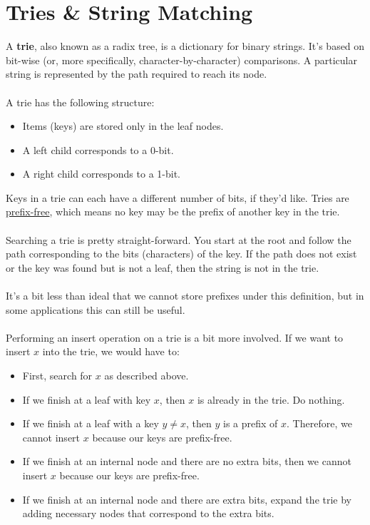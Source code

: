 \documentclass[]{article}
\theoremstyle{definition}
\newcommand{\lecture}[1]{\marginpar{{\footnotesize $\leftarrow$ \underline{#1}}}}
\begin{document}
	\section{Tries \& String Matching} \lecture{March 19, 2013} %
		A \textbf{trie}, also known as a radix tree, is a dictionary for binary strings. It's based on bit-wise (or, more specifically, character-by-character) comparisons. A particular string is represented by the path required to reach its node.
		\\ \\
		A trie has the following structure:
		\begin{itemize}
			\item Items (keys) are stored only in the leaf nodes.
			\item A left child corresponds to a 0-bit.
			\item A right child corresponds to a 1-bit.
		\end{itemize}

		Keys in a trie can each have a different number of bits, if they'd like. Tries are \underline{prefix-free}, which means no key may be the prefix of another key in the trie.
		\\ \\
		Searching a trie is pretty straight-forward. You start at the root and follow the path corresponding to the bits (characters) of the key. If the path does not exist or the key was found but is not a leaf, then the string is not in the trie.
		\\ \\
		It's a bit less than ideal that we cannot store prefixes under this definition, but in some applications this can still be useful.
		\\ \\
		Performing an insert operation on a trie is a bit more involved. If we want to insert $x$ into the trie, we would have to:
		\begin{itemize}
			\item First, search for $x$ as described above.
			\item If we finish at a leaf with key $x$, then $x$ is already in the trie. Do nothing.
			\item If we finish at a leaf with a key $y \ne x$, then $y$ is a prefix of $x$. Therefore, we cannot insert $x$ because our keys are prefix-free.
			\item If we finish at an internal node and there are no extra bits, then we cannot insert $x$ because our keys are prefix-free.
			\item If we finish at an internal node and there are extra bits, expand the trie by adding necessary nodes that correspond to the extra bits.
		\end{itemize}
\end{document}
